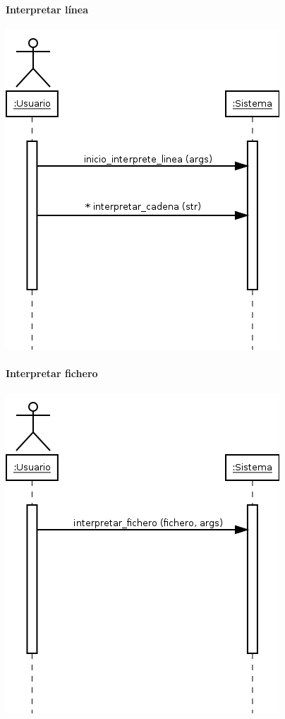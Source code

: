 \paragraph{Interpretar línea}
\begin{center}
\includegraphics[scale=0.4]{interpretar_line.png} \\
\end{center}

\paragraph{Interpretar fichero}
\begin{center}
\includegraphics[scale=0.4]{interpretar_file.png} \\
\end{center}

